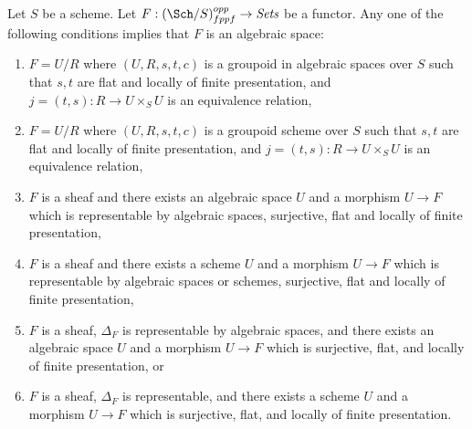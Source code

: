 %

\begin{theorem}
\label{theorem-final-bootstrap}
Let $S$ be a scheme.
Let $F : (\Sch/S)_{fppf}^{opp} \to \textit{Sets}$ be a functor.
Any one of the following conditions implies that $F$ is an algebraic space:
\begin{enumerate}
\item $F = U/R$ where $(U, R, s, t, c)$ is a groupoid in algebraic spaces
over $S$ such that $s, t$ are flat and locally of finite presentation, and
$j = (t, s) : R \to U \times_S U$ is an equivalence relation,
\item $F = U/R$ where $(U, R, s, t, c)$ is a groupoid scheme
over $S$ such that $s, t$ are flat and locally of finite presentation, and
$j = (t, s) : R \to U \times_S U$ is an equivalence relation,
\item $F$ is a sheaf and there exists an algebraic space $U$ and a morphism
$U \to F$ which is representable by algebraic spaces,
surjective, flat and locally of finite presentation,
\item $F$ is a sheaf and there exists a scheme $U$ and a morphism
$U \to F$ which is representable by algebraic spaces or schemes,
surjective, flat and locally of finite presentation,
\item $F$ is a sheaf, $\Delta_F$ is representable by algebraic spaces,
and there exists an algebraic space $U$ and a morphism $U \to F$ which is
surjective, flat, and locally of finite presentation, or
\item $F$ is a sheaf, $\Delta_F$ is representable,
and there exists a scheme $U$ and a morphism $U \to F$ which is
surjective, flat, and locally of finite presentation.
\end{enumerate}
\end{theorem}

